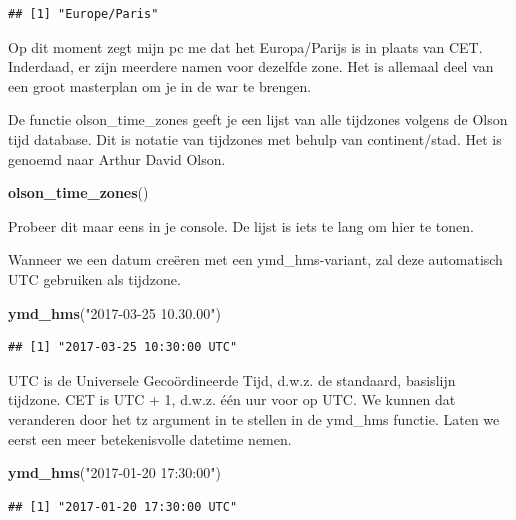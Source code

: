 \documentclass[]{tufte-book}
\newenvironment{Shaded}{}{}
\newcommand{\KeywordTok}[1]{\textcolor[rgb]{0.00,0.44,0.13}{\textbf{#1}}}
\newcommand{\NormalTok}[1]{#1}
\newcommand{\StringTok}[1]{\textcolor[rgb]{0.25,0.44,0.63}{#1}}
\begin{document}
\begin{verbatim}
## [1] "Europe/Paris"
\end{verbatim}

Op dit moment zegt mijn pc me dat het Europa/Parijs is in plaats van CET. Inderdaad, er zijn meerdere namen voor dezelfde zone. Het is allemaal deel van een groot masterplan om je in de war te brengen.

De functie olson\_time\_zones geeft je een lijst van alle tijdzones volgens de Olson tijd database. Dit is notatie van tijdzones met behulp van continent/stad. Het is genoemd naar Arthur David Olson.

\begin{Shaded}
\begin{Highlighting}[]
\KeywordTok{olson_time_zones}\NormalTok{()}
\end{Highlighting}
\end{Shaded}

Probeer dit maar eens in je console. De lijst is iets te lang om hier te tonen.

Wanneer we een datum creëren met een ymd\_hms-variant, zal deze automatisch UTC gebruiken als tijdzone.

\begin{Shaded}
\begin{Highlighting}[]
\KeywordTok{ymd_hms}\NormalTok{(}\StringTok{"2017-03-25 10.30.00"}\NormalTok{)}
\end{Highlighting}
\end{Shaded}

\begin{verbatim}
## [1] "2017-03-25 10:30:00 UTC"
\end{verbatim}

UTC is de Universele Gecoördineerde Tijd, d.w.z. de standaard, basislijn tijdzone. CET is UTC + 1, d.w.z. één uur voor op UTC. We kunnen dat veranderen door het tz argument in te stellen in de ymd\_hms functie. Laten we eerst een meer betekenisvolle datetime nemen.

\begin{Shaded}
\begin{Highlighting}[]
\KeywordTok{ymd_hms}\NormalTok{(}\StringTok{"2017-01-20 17:30:00"}\NormalTok{)}
\end{Highlighting}
\end{Shaded}

\begin{verbatim}
## [1] "2017-01-20 17:30:00 UTC"
\end{verbatim}
\end{document}

